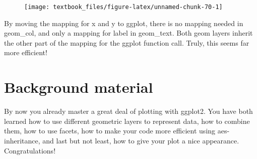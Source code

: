\documentclass[]{tufte-book}
\newenvironment{Shaded}{}{}
\newcommand{\DataTypeTok}[1]{\textcolor[rgb]{0.56,0.13,0.00}{#1}}
\newcommand{\DecValTok}[1]{\textcolor[rgb]{0.25,0.63,0.44}{#1}}
\newcommand{\KeywordTok}[1]{\textcolor[rgb]{0.00,0.44,0.13}{\textbf{#1}}}
\newcommand{\NormalTok}[1]{#1}
\newcommand{\OperatorTok}[1]{\textcolor[rgb]{0.40,0.40,0.40}{#1}}
\newcommand{\StringTok}[1]{\textcolor[rgb]{0.25,0.44,0.63}{#1}}
\begin{document}
\begin{Shaded}
\end{Shaded}

\begin{figure}
\texttt{[image: textbook\_files/figure-latex/unnamed-chunk-70-1]} \end{figure}

By moving the mapping for x and y to ggplot, there is no mapping needed in geom\_col, and only a mapping for label in geom\_text. Both geom layers inherit the other part of the mapping for the ggplot function call. Truly, this seems far more efficient!

\hypertarget{background-material}{%
\section{Background material}\label{background-material}}

By now you already master a great deal of plotting with ggplot2. You have both learned how to use different geometric layers to represent data, how to combine them, how to use facets, how to make your code more efficient using aes-inheritance, and last but not least, how to give your plot a nice appearance. Congratulations!
\end{document}
